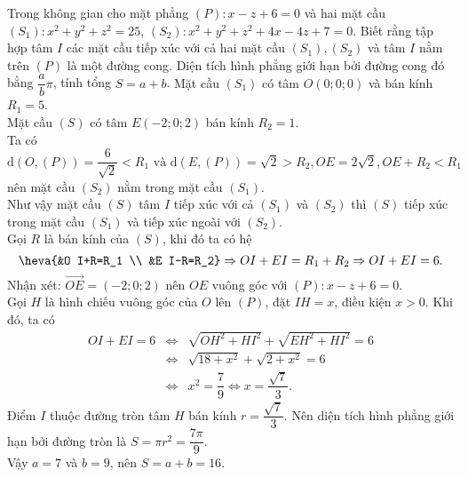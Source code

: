 \begin{ex}%
	Trong không gian cho mặt phẳng $(P)\colon x-z+6=0$ và hai mặt cầu $\left(S_1\right)\colon x^2+y^2+z^2=25$, $\left(S_2\right)\colon x^2+y^2+z^2+4 x-4 z+7=0$. Biết rằng tập hợp tâm $I$ các mặt cầu tiếp xúc với cả hai mặt cầu $\left(S_1\right),\left(S_2\right)$ và tâm $I$ nằm trên $(P)$ là một đường cong. Diện tích hình phẳng giới hạn bởi đường cong đó bằng $\dfrac{a}{b}\pi$, tính tổng $S=a+b$.
	\loigiai
	{
	Mặt cầu $\left(S_1\right)$ có tâm $O(0; 0; 0)$ và bán kính $R_1=5$. \\
	Mặt cầu $(S)$ có tâm $E(-2; 0; 2)$ bán kính $R_2=1$.\\
	Ta có 
	$$\mathrm{d}(O,(P))=\dfrac{6}{\sqrt{2}}<R_1 \text{ và } \mathrm{d}({E},(P))=\sqrt{2}>R_2, O E=2 \sqrt{2}, O E+R_2<R_1$$ 
	nên mặt cầu $\left(S_2\right)$ nằm trong mặt cầu $\left(S_1\right)$.\\ 
	Như vậy mặt cầu $(S)$ tâm $I$ tiếp xúc với cả $\left(S_1\right)$ và $\left(S_2\right)$ thì $(S)$ tiếp xúc trong mặt cầu $\left(S_1\right)$ và tiếp xúc ngoài với $\left(S_2\right)$.\\ 
	Gọi $R$ là bán kính của $(S)$, khi đó ta có hệ
	$$
	\heva{&O I+R=R_1 \\ &E I-R=R_2}\Rightarrow O I+E I=R_1+R_2 \Rightarrow O I+E I=6.
	$$ 
	Nhận xét: $\overrightarrow{O E}=(-2; 0; 2)$ nên $O E$ vuông góc với $(P)\colon x-z+6=0$.\\
	Gọi $H$ là hình chiếu vuông góc của $O$ lên $(P)$, đặt $I H=x$, điều kiện $x>0$. Khi đó, ta có
	{\allowdisplaybreaks
		\begin{eqnarray*}
		O I+E I=6 &\Leftrightarrow& \sqrt{O H^2+H I^2}+\sqrt{E H^2+H I^2}=6\\
		 &\Leftrightarrow& \sqrt{18+x^2}+\sqrt{2+x^2}=6\\
		 &\Leftrightarrow& x^2=\dfrac{7}{9} \Leftrightarrow x=\dfrac{\sqrt{7}}{3}.	
	\end{eqnarray*}}
	Điểm $I$ thuộc đường tròn tâm $H$ bán kính $r=\dfrac{\sqrt{7}}{3}$.
	Nên diện tích hình phẳng giới hạn bởi đường tròn là $S=\pi r^2=\dfrac{7 \pi}{9}$.\\
	Vậy $a=7$ và $b=9$, nên $S=a+b=16$.
	}
\end{ex}

